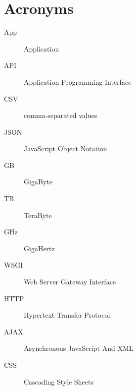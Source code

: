 \documentclass{DeustoFDP}
\begin{document}
\printbibliography[heading=bibintoc]
\chapter{Acronyms}\label{cha:acronyms}
\begin{description}
	\item[App] Application
	\item[API] Application Programming Interface
	\item[CSV] comma-separated values
	\item[JSON] JavaScript Object Notation
	\item[GB] GigaByte
	\item[TB] TeraByte
	\item[GHz] GigaHertz
	\item[WSGI] Web Server Gateway Interface
	\item[HTTP] Hypertext Transfer Protocol 
	\item[AJAX] Asynchronous JavaScript And XML
	\item[CSS] Cascading Style Sheets
\end{description}

\appendix

\backmatter
\end{document}
